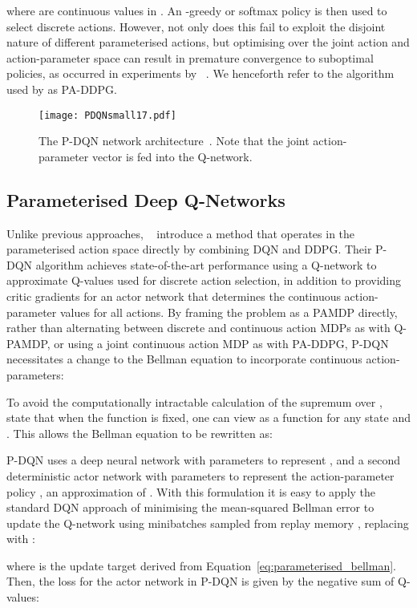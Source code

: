 \documentclass{article}
\def\PDQN*{P\nobreakdash-DQN}
\def\QPAMDP*{Q\nobreakdash-PAMDP}
\def\PADDPG*{PA\nobreakdash-DDPG}
\newcommand{\citet}[1]
{\citeauthor{#1}~\shortcite{#1}}
\newcommand{\citep}{\cite}
\begin{document}
where  are continuous values in . An -greedy or softmax policy is then used to select discrete actions. However, not only does this fail to exploit the disjoint nature of different parameterised actions, but optimising over the joint action and action-parameter space can result in premature convergence to suboptimal policies, as occurred in experiments by \citet{masson2016}. We henceforth refer to the algorithm used by \citeauthor{hausknecht2016} as \PADDPG*. 


\begin{figure}
	\centering
\texttt{[image: PDQNsmall17.pdf]}
	\caption[The \PDQN* network architecture]{The \PDQN* network architecture~\protect\citep{xiong2018}. Note that the joint action-parameter vector  is fed into the Q-network.}
	\label{fig:pdqn}
\end{figure}

\subsection{Parameterised Deep Q-Networks}
Unlike previous approaches, \citet{xiong2018} introduce a method that operates in the parameterised action space directly by combining DQN and DDPG. Their \PDQN* algorithm achieves state-of-the-art performance using a Q-network to approximate Q-values used for discrete action selection, in addition to providing critic gradients for an actor network that determines the continuous action-parameter values for all actions.
By framing the problem as a PAMDP directly, rather than alternating between discrete and continuous action MDPs as with \QPAMDP*, or using a joint continuous action MDP as with \PADDPG*, \PDQN* necessitates a change to the Bellman equation to incorporate continuous action-parameters:

To avoid the computationally intractable calculation of the supremum over , \citet{xiong2018} state that when the  function is fixed, one can view  as a function  for any state  and . This allows the Bellman equation to be rewritten as:

\PDQN* uses a deep neural network with parameters  to represent , and a second deterministic actor network with parameters  to represent the action-parameter policy , an approximation of . With this formulation it is easy to apply the standard DQN approach of minimising the mean-squared Bellman error to update the Q-network using minibatches sampled from replay memory  \cite{mnih2015}, replacing  with :

where  is the update target derived from Equation~\eqref{eq:parameterised_bellman}. Then, the loss for the actor network in \PDQN* is given by the negative sum of Q-values:
\end{document}
